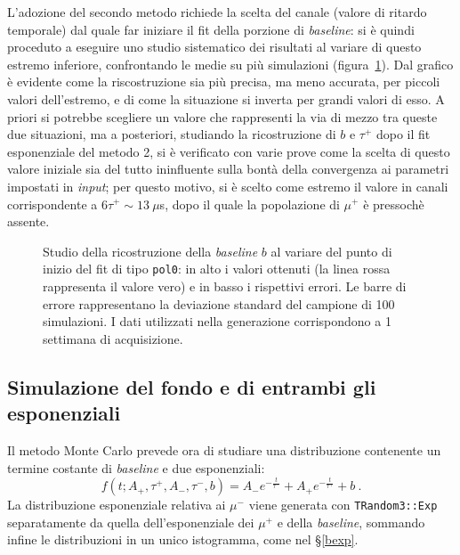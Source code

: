 \documentclass[10pt, oneside, a4paper]{article}   	%
\begin{document}
L'adozione del secondo metodo richiede la scelta del canale (valore di ritardo temporale) dal quale far iniziare il fit della porzione di \textit{baseline}: si è quindi proceduto a eseguire uno studio sistematico dei risultati al variare di questo estremo inferiore, confrontando le medie su più simulazioni (figura~\ref{baselinestart}). Dal grafico è evidente come la riscostruzione sia più precisa, ma meno accurata, per piccoli valori dell'estremo, e di come la situazione si inverta per grandi valori di esso. A priori si potrebbe scegliere un valore che rappresenti la via di mezzo tra queste due situazioni, ma a posteriori, studiando la ricostruzione di $b$ e $\tau^+$ dopo il fit esponenziale del metodo 2, si è verificato con varie prove come la scelta di questo valore iniziale sia del tutto ininfluente sulla bontà della convergenza ai parametri impostati in \textit{input}; per questo motivo, si è scelto come estremo il valore in canali corrispondente a $6\tau^+\sim13\ \mu$s, dopo il quale la popolazione di $\mu^+$ è pressochè assente.

%
\begin{figure}[h]
  \centerline{}
  \caption{Studio della ricostruzione della \textit{baseline} $b$ al variare del punto di inizio del fit di tipo \texttt{pol0}: in alto i valori ottenuti (la linea rossa rappresenta il valore vero) e in basso i rispettivi errori. Le barre di errore rappresentano la deviazione standard del campione di 100 simulazioni. I dati utilizzati nella generazione corrispondono a 1 settimana di acquisizione.}\label{baselinestart}
\end{figure}
%
\subsection{Simulazione del fondo e di entrambi gli esponenziali}\label{bexpexp}
Il metodo Monte Carlo prevede ora di studiare una distribuzione contenente un termine costante di \textit{baseline} e due esponenziali:
\begin{equation}
 f(t;A_+,\tau^+,A_-,\tau^-, b)=A_-e^{-\frac{t}{\tau^-}}+A_+e^{-\frac{t}{\tau^+}}+b\ .
 \label{eq::funzione_fit_finale}
\end{equation}
La distribuzione esponenziale relativa ai $\mu^-$ viene generata con \lstinline{TRandom3::Exp} separatamente da quella dell'esponenziale dei $\mu^+$ e della \textit{baseline}, sommando infine le distribuzioni in un unico istogramma, come nel \S\ref{bexp}. 
\end{document}
